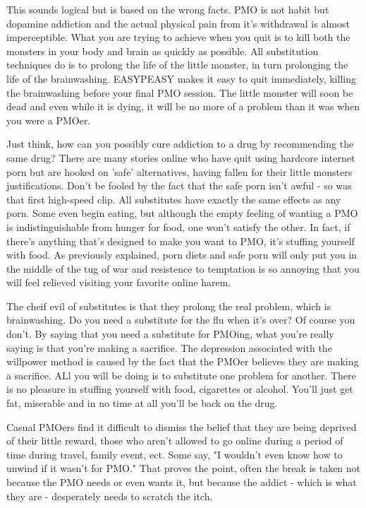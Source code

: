 \documentclass[easypeasy.tex]{subfiles}
\begin{document}
This sounds logical but is based on the wrong facts. PMO is not habit but dopamine addiction and the actual physical pain from it's withdrawal is almost imperceptible. What you are trying to achieve when you quit is to kill both the monsters in your body and brain as quickly as possible. All substitution techniques do is to prolong the life of the little monster, in turn prolonging the life of the brainwashing. EASYPEASY makes it easy to quit immediately, killing the brainwashing before your final PMO session. The little monster will soon be dead and even while it is dying, it will be no more of a problem than it was when you were a PMOer.

Just think, how can you possibly cure addiction to a drug by recommending the same drug? There are many stories online who have quit using hardcore internet porn but are hooked on 'safe' alternatives, having fallen for their little monsters justifications. Don't be fooled by the fact that the safe porn isn't awful - so was that first high-speed clip. All substitutes have exactly the same effects as any porn. Some even begin eating, but although the empty feeling of wanting a PMO is indistinguishable from hunger for food, one won't satisfy the other. In fact, if there's anything that's designed to make you want to PMO, it's stuffing yourself with food. As previously explained, porn diets and safe porn will only put you in the middle of the tug of war and resistence to temptation is so annoying that you will feel relieved visiting your favorite online harem.

The cheif evil of substitutes is that they prolong the real problem, which is brainwashing. Do you need a substitute for the flu when it's over? Of course you don't. By saying that you need a substitute for PMOing, what you're really saying is that you're making a sacrifice. The depression associated with the willpower method is caused by the fact that the PMOer believes they are making a sacrifice. ALl you will be doing is to substitute one problem for another. There is no pleasure in stuffing yourself with food, cigarettes or alcohol. You'll just get fat, miserable and in no time at all you'll be back on the drug.

Casual PMOers find it difficult to dismiss the belief that they are being deprived of their little reward, those who aren't allowed to go online during a period of time during travel, family event, ect. Some say, "I wouldn't even know how to unwind if it wasn't for PMO." That proves the point, often the break is taken not because the PMO needs or even wants it, but because the addict - which is what they are - desperately needs to scratch the itch.
\end{document}
